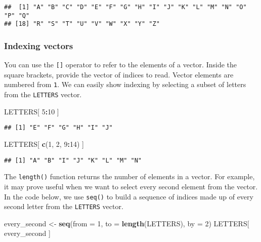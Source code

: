 \documentclass[]{book}
\newenvironment{Shaded}{\begin{snugshade}}{\end{snugshade}}
\newcommand{\KeywordTok}[1]{\textcolor[rgb]{0.13,0.29,0.53}{\textbf{#1}}}
\newcommand{\DataTypeTok}[1]{\textcolor[rgb]{0.13,0.29,0.53}{#1}}
\newcommand{\DecValTok}[1]{\textcolor[rgb]{0.00,0.00,0.81}{#1}}
\newcommand{\StringTok}[1]{\textcolor[rgb]{0.31,0.60,0.02}{#1}}
\newcommand{\OperatorTok}[1]{\textcolor[rgb]{0.81,0.36,0.00}{\textbf{#1}}}
\newcommand{\NormalTok}[1]{#1}
\theoremstyle{definition}
\theoremstyle{definition}
\theoremstyle{definition}
\theoremstyle{remark}
\begin{document}
\begin{verbatim}
##  [1] "A" "B" "C" "D" "E" "F" "G" "H" "I" "J" "K" "L" "M" "N" "O" "P" "Q"
## [18] "R" "S" "T" "U" "V" "W" "X" "Y" "Z"
\end{verbatim}

\subsubsection{Indexing vectors}\label{part_2211}

You can use the \texttt{{[}{]}} operator to refer to the elements of a
vector. Inside the square brackets, provide the vector of indices to
read. Vector elements are numbered from \texttt{1}. We can easily show
indexing by selecting a subset of letters from the \texttt{LETTERS}
vector.

\begin{Shaded}
\begin{Highlighting}[]
\NormalTok{LETTERS[ }\DecValTok{5}\OperatorTok{:}\DecValTok{10}\NormalTok{ ]}
\end{Highlighting}
\end{Shaded}

\begin{verbatim}
## [1] "E" "F" "G" "H" "I" "J"
\end{verbatim}

\begin{Shaded}
\begin{Highlighting}[]
\NormalTok{LETTERS[ }\KeywordTok{c}\NormalTok{(}\DecValTok{1}\NormalTok{, }\DecValTok{2}\NormalTok{, }\DecValTok{9}\OperatorTok{:}\DecValTok{14}\NormalTok{) ]}
\end{Highlighting}
\end{Shaded}

\begin{verbatim}
## [1] "A" "B" "I" "J" "K" "L" "M" "N"
\end{verbatim}

The \texttt{length()} function returns the number of elements in a
vector. For example, it may prove useful when we want to select every
second element from the vector. In the code below, we use \texttt{seq()}
to build a sequence of indices made up of every second letter from the
\texttt{LETTERS} vector.

\begin{Shaded}
\begin{Highlighting}[]
\NormalTok{every_second <-}\StringTok{ }\KeywordTok{seq}\NormalTok{(}\DataTypeTok{from =} \DecValTok{1}\NormalTok{, }\DataTypeTok{to =} \KeywordTok{length}\NormalTok{(LETTERS), }\DataTypeTok{by =} \DecValTok{2}\NormalTok{)}
\NormalTok{LETTERS[ every_second ]}
\end{Highlighting}
\end{Shaded}
\end{document}
